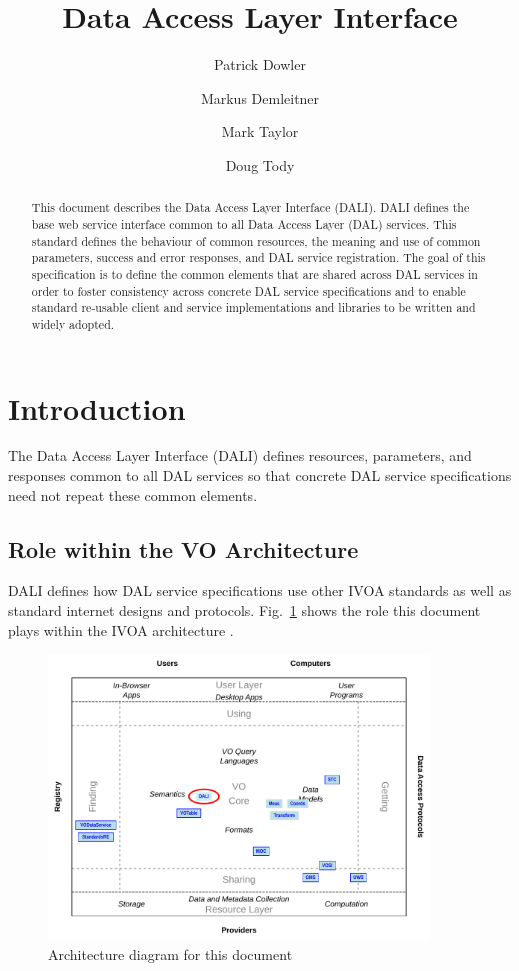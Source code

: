 \documentclass[11pt,letter]{ivoa}
\title{Data Access Layer Interface}
\author{Patrick Dowler}
\author{Markus Demleitner}
\author{Mark Taylor}
\author{Doug Tody}
\begin{document}
\begin{abstract}
This document describes the Data Access Layer Interface (DALI). DALI defines
the base web service interface common to all Data Access Layer (DAL) services.
This standard defines the behaviour of common resources, the meaning and use of
common parameters, success and error responses, and DAL service registration.
The goal of this specification is to define the common elements that are shared
across DAL services in order to foster consistency across concrete DAL service
specifications and to enable standard re-usable client and service
implementations and libraries to be written and widely adopted.
\end{abstract}

\section{Introduction}
The Data Access Layer Interface (DALI) defines resources, parameters, and
responses common to all DAL services so that concrete DAL service specifications
need not repeat these common elements.

\subsection{Role within the VO Architecture}
DALI defines how DAL service specifications use other IVOA standards as well as
standard internet designs and protocols. Fig.~\ref{fig:archdiag} shows the role
this document plays within the IVOA architecture \citep{2021ivoa.spec.1101D}.

\begin{figure}
\centering


\includegraphics[width=0.9\textwidth]{role_diagram.pdf}
\caption{Architecture diagram for this document}
\label{fig:archdiag}
\end{figure}
\end{document}
